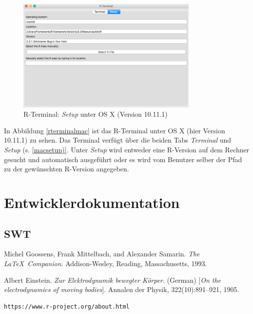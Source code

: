 \documentclass[a4paper, 12pt]{report} %
\begin{document}
\begin{figure}[htpb]
\centering
\includegraphics[width=0.8\textwidth]{rterminalsetup}
\caption{R-Terminal: \textit{Setup} unter OS X (Version 10.11.1)}
\label{macsetup}
\end{figure}

In Abbildung \ref{rterminalmac} ist das R-Terminal unter OS X (hier Version 10.11.1) zu sehen. Das Terminal verfügt über die beiden Tabs \textit{Terminal} und \textit{Setup} (s. \ref{macsetup)}. Unter \textit{Setup} wird entweder eine R-Version auf dem Rechner gesucht und automatisch ausgeführt oder es wird vom Benutzer selber der Pfad zu der gewünschten R-Version angegeben. 
\chapter{Entwicklerdokumentation}
\section{SWT}



%

%
\begin{thebibliography}{9} %
Michel Goossens, Frank Mittelbach, and Alexander Samarin. 
\textit{The \LaTeX\ Companion}. 
Addison-Wesley, Reading, Massachusetts, 1993.
 
Albert Einstein. 
\textit{Zur Elektrodynamik bewegter K{\"o}rper}. (German) 
[\textit{On the electrodynamics of moving bodies}]. 
Annalen der Physik, 322(10):891–921, 1905.

 
\texttt{https://www.r-project.org/about.html}
\end{thebibliography}
\end{document}
